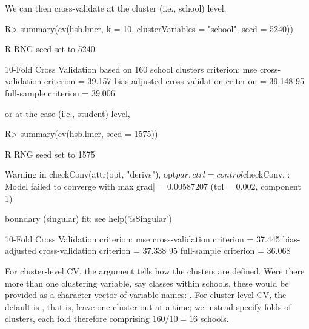 \documentclass[
]{jss}
\begin{document}
We can then cross-validate at the cluster (i.e., school) level,

\begin{CodeChunk}
\begin{CodeInput}
R> summary(cv(hsb.lmer, k = 10, clusterVariables = "school", seed = 5240))
\end{CodeInput}
\begin{CodeOutput}
R RNG seed set to 5240
\end{CodeOutput}
\begin{CodeOutput}
10-Fold Cross Validation based on 160 {school} clusters
criterion: mse
cross-validation criterion = 39.157
bias-adjusted cross-validation criterion = 39.148
95%
full-sample criterion = 39.006
\end{CodeOutput}
\end{CodeChunk}

or at the case (i.e., student) level,

\begin{CodeChunk}
\begin{CodeInput}
R> summary(cv(hsb.lmer, seed = 1575))
\end{CodeInput}
\begin{CodeOutput}
R RNG seed set to 1575
\end{CodeOutput}
\begin{CodeOutput}
Warning in checkConv(attr(opt, "derivs"), opt$par, ctrl = control$checkConv, :
Model failed to converge with max|grad| = 0.00587207 (tol = 0.002, component 1)
\end{CodeOutput}
\begin{CodeOutput}
boundary (singular) fit: see help('isSingular')
\end{CodeOutput}
\begin{CodeOutput}
10-Fold Cross Validation
criterion: mse
cross-validation criterion = 37.445
bias-adjusted cross-validation criterion = 37.338
95%
full-sample criterion = 36.068
\end{CodeOutput}
\end{CodeChunk}

For cluster-level CV, the  argument tells
 how the clusters are defined. Were there more than one
clustering variable, say classes within schools, these would be provided
as a character vector of variable names:
. For cluster-level CV,
the default is , that is, leave one cluster out at a
time; we instead specify  folds of clusters, each fold
therefore comprising \(160/10 = 16\) schools.
\end{document}
